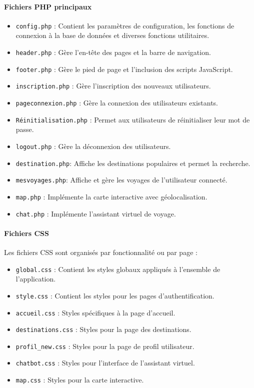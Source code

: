\documentclass[a4paper,12pt]{article}
\begin{document}
\paragraph{Fichiers PHP principaux}
\begin{itemize}
    \item \texttt{config.php} : Contient les paramètres de configuration, les fonctions de connexion
à la base de données et diverses fonctions utilitaires.
     \item\texttt{header.php} : Gère l'en-tête des pages et la barre de navigation.
     \item\texttt{footer.php} : Gère le pied de page et l'inclusion des scripts JavaScript.
    \item \texttt{inscription.php} : Gère l'inscription des nouveaux utilisateurs.
     \item\texttt{pageconnexion.php} : Gère la connexion des utilisateurs existants.
     \item\texttt{Réinitialisation.php} : Permet aux utilisateurs de réinitialiser leur mot de passe.
     \item\texttt{logout.php} : Gère la déconnexion des utilisateurs.
    \item \texttt{destination.php}: Affiche les destinations populaires et permet la recherche.
     \item\texttt{mesvoyages.php}:  Affiche et gère les voyages de l'utilisateur connecté.
     \item\texttt{map.php} : Implémente la carte interactive avec géolocalisation. 
    \item \texttt{chat.php} : Implémente l'assistant virtuel de voyage.
\end{itemize}

\paragraph{Fichiers CSS}

Les fichiers CSS sont organisés par fonctionnalité ou par page :
\begin{itemize}
  \item \texttt{global.css} : Contient les styles globaux appliqués à l'ensemble de l'application.
  \item \texttt{style.css} : Contient les styles pour les pages d'authentification.
  \item \texttt{accueil.css} : Styles spécifiques à la page d'accueil.
  \item \texttt{destinations.css} : Styles pour la page des destinations.
  \item \texttt{profil\_new.css} : Styles pour la page de profil utilisateur.
  \item \texttt{chatbot.css} : Styles pour l'interface de l'assistant virtuel.
  \item \texttt{map.css} : Styles pour la carte interactive.
\end{itemize}
\end{document}
